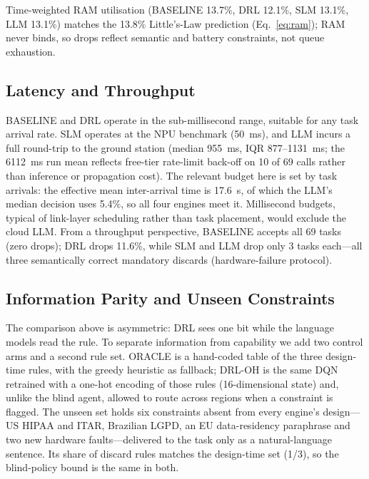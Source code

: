 \documentclass[conference,comsoc,twoside,caption=false]{IEEEtran}
\theoremstyle{definition}
\begin{document}
Time-weighted RAM utilisation (BASELINE 13.7\%, DRL 12.1\%, SLM 13.1\%,
LLM 13.1\%) matches the 13.8\% Little's-Law prediction
(Eq.~\ref{eq:ram}); RAM never binds, so drops reflect semantic and battery
constraints, not queue exhaustion.

\subsection{Latency and Throughput}

\balance
BASELINE and DRL operate in the sub-millisecond range, suitable for any task
arrival rate. SLM operates at the NPU benchmark (\SI{50}{\milli\second}), and
LLM incurs a full round-trip to the ground station
(median \SI{955}{\milli\second}, IQR \numrange{877}{1131}~ms; the
\SI{6112}{\milli\second} run mean reflects free-tier rate-limit back-off on 10
of 69 calls rather than inference or propagation cost). The relevant budget
here is set by task arrivals: the effective mean inter-arrival time is
17.6~s, of which the LLM's median decision uses 5.4\%, so all four engines
meet it. Millisecond budgets, typical of link-layer scheduling rather than task
placement, would exclude the cloud LLM. From a throughput
perspective, BASELINE accepts all 69 tasks (zero drops); DRL drops
11.6\%, while SLM and LLM drop only 3 tasks each---all three semantically
correct mandatory discards (hardware-failure protocol).

\subsection{Information Parity and Unseen Constraints}
\label{sec:generalization}

The comparison above is asymmetric: DRL sees one bit while the language models
read the rule. To separate information from capability we add two control arms
and a second rule set. ORACLE is a hand-coded table of the three design-time
rules, with the greedy heuristic as fallback; DRL-OH is the same DQN retrained
with a one-hot encoding of those rules (16-dimensional state) and, unlike the
blind agent, allowed to route across regions when a constraint is flagged. The unseen set
holds six constraints absent from every engine's design---US HIPAA and ITAR,
Brazilian LGPD, an EU data-residency paraphrase and two new hardware
faults---delivered to the task only as a natural-language sentence. Its share of
discard rules matches the design-time set (1/3), so the blind-policy bound is
the same in both.
\end{document}
